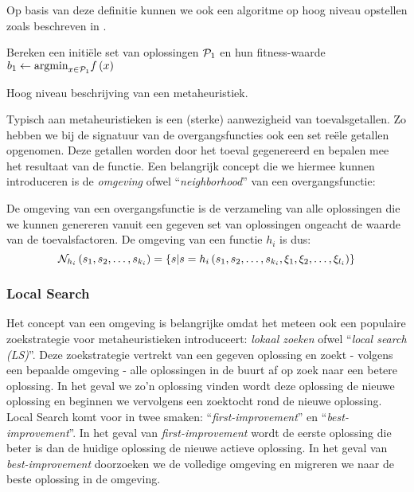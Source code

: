 Op basis van deze definitie kunnen we ook een algoritme op hoog niveau opstellen zoals beschreven in .

\begin{algorithm}[H]
 \SetAlgoLined
 Bereken een initi\"ele set van oplossingen $\mathcal{P}_1$ en hun fitness-waarde\;
 $b_1\leftarrow\displaystyle\mbox{argmin}_{x\in\mathcal{P}_1}{f\left(x\right)}$\;
 \caption{Hoog niveau beschrijving van een metaheuristiek\cite{DBLP:journals/jc/ShonkwilerV94}.}
\end{algorithm}

Typisch aan metaheuristieken is een (sterke) aanwezigheid van toevalsgetallen. Zo hebben we bij de signatuur van de overgangsfuncties ook een set re\"ele getallen opgenomen. Deze getallen worden door het toeval gegenereerd en bepalen mee het resultaat van de functie. Een belangrijk concept die we hiermee kunnen introduceren is de \emph{omgeving} ofwel ``\emph{neighborhood}'' van een overgangsfunctie:

\begin{definition}
De omgeving van een overgangsfunctie is de verzameling van alle oplossingen die we kunnen genereren vanuit een gegeven set van oplossingen ongeacht de waarde van de toevalsfactoren. De omgeving van een functie $h_i$ is dus:
\begin{equation}
\mathcal{N}_{h_i}\left(s_1,s_2,\ldots,s_{k_i}\right)=\left\{ s|s=h_i\left(s_1,s_2,\ldots,s_{k_i},\xi_1,\xi_2,\ldots,\xi_{l_i}\right)\right\}
\end{equation}
\end{definition}

\subsubsection{Local Search}
Het concept van een omgeving is belangrijke omdat het meteen ook een populaire zoekstrategie voor metaheuristieken introduceert: \emph{lokaal zoeken} ofwel ``\emph{local search (LS)}''. Deze zoekstrategie vertrekt van een gegeven oplossing en zoekt - volgens een bepaalde omgeving - alle oplossingen in de buurt af op zoek naar een betere oplossing. In het geval we zo'n oplossing vinden wordt deze oplossing de nieuwe oplossing en beginnen we vervolgens een zoektocht rond de nieuwe oplossing. Local Search komt voor in twee smaken: ``\emph{first-improvement}'' en ``\emph{best-improvement}''. In het geval van \emph{first-improvement} wordt de eerste oplossing die beter is dan de huidige oplossing de nieuwe actieve oplossing. In het geval van \emph{best-improvement} doorzoeken we de volledige omgeving en migreren we naar de beste oplossing in de omgeving.
